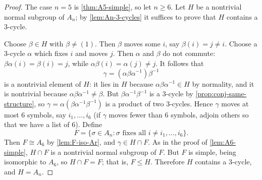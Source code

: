 \begin{proof}
	The case \(n = 5\) is \autoref{thm:A5-simple}, so let \(n \geq 6\). Let \(H\) be a
	nontrivial normal subgroup of \(A_n\); by \autoref{lem:An-3-cycles} it suffices to
	prove that \(H\) contains a \(3\)-cycle.

	Choose \(\beta \in H\) with \(\beta \neq (1)\). Then \(\beta\) moves some \(i\), say
	\(\beta(i) = j \neq i\). Choose a \(3\)-cycle \(\alpha\) which fixes \(i\) and moves
	\(j\). Then \(\alpha\) and \(\beta\) do not commute:
	\(\beta\alpha(i) = \beta(i) = j\), while \(\alpha\beta(i) = \alpha(j) \neq j\). It
	follows that
	\[
		\gamma = (\alpha\beta\alpha^{-1})\beta^{-1}
	\]
	is a nontrivial element of \(H\): it lies in \(H\) because
	\(\alpha\beta\alpha^{-1} \in H\) by normality, and it is nontrivial because
	\(\alpha\beta\alpha^{-1} \neq \beta\). But \(\beta\alpha^{-1}\beta^{-1}\) is a
	\(3\)-cycle by \autoref{prop:conj-same-structure}, so
	\(\gamma = \alpha(\beta\alpha^{-1}\beta^{-1})\) is a product of two \(3\)-cycles.
	Hence \(\gamma\) moves at most \(6\) symbols, say \(i_1, \dots, i_6\) (if \(\gamma\)
	moves fewer than \(6\) symbols, adjoin others so that we have a list of \(6\)). Define
	\[
		F = \{\sigma \in A_n : \sigma \text{ fixes all } i \neq i_1, \dots, i_6\}.
	\]
	Then \(F \cong A_6\) by \autoref{lem:F-iso-Ar}, and \(\gamma \in H \cap F\). As in the
	proof of \autoref{lem:A6-simple}, \(H \cap F\) is a nontrivial normal subgroup of
	\(F\). But \(F\) is simple, being isomorphic to \(A_6\), so \(H \cap F = F\); that is,
	\(F \leq H\). Therefore \(H\) contains a \(3\)-cycle, and \(H = A_n\).
\end{proof}
